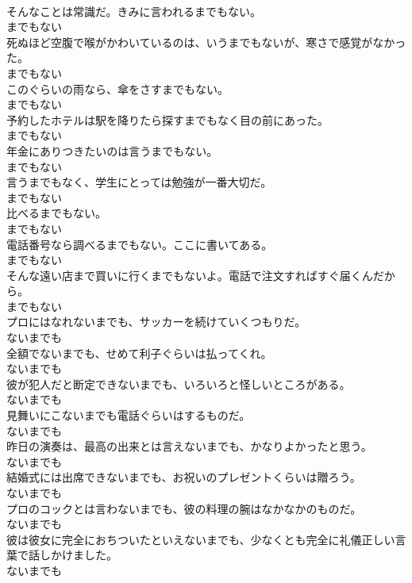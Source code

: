\documentclass[8pt]{extreport}
\begin{document}
\begin{CJK}{UTF8}{min}
\\	そんなことは常識だ。きみに言われるまでもない。	
\\	までもない
\\	死ぬほど空腹で喉がかわいているのは、いうまでもないが、寒さで感覚がなかった。	
\\	までもない
\\	このぐらいの雨なら、傘をさすまでもない。	
\\	までもない
\\	予約したホテルは駅を降りたら探すまでもなく目の前にあった。	
\\	までもない
\\	年金にありつきたいのは言うまでもない。	
\\	までもない
\\	言うまでもなく、学生にとっては勉強が一番大切だ。	
\\	までもない
\\	比べるまでもない。	
\\	までもない
\\	電話番号なら調べるまでもない。ここに書いてある。	
\\	までもない
\\	そんな遠い店まで買いに行くまでもないよ。電話で注文すればすぐ届くんだから。	
\\	までもない
\\	プロにはなれないまでも、サッカーを続けていくつもりだ。	
\\	ないまでも
\\	全額でないまでも、せめて利子ぐらいは払ってくれ。	
\\	ないまでも
\\	彼が犯人だと断定できないまでも、いろいろと怪しいところがある。	
\\	ないまでも
\\	見舞いにこないまでも電話ぐらいはするものだ。	
\\	ないまでも
\\	昨日の演奏は、最高の出来とは言えないまでも、かなりよかったと思う。	
\\	ないまでも
\\	結婚式には出席できないまでも、お祝いのプレゼントくらいは贈ろう。	
\\	ないまでも
\\	プロのコックとは言わないまでも、彼の料理の腕はなかなかのものだ。	
\\	ないまでも
\\	彼は彼女に完全におちついたといえないまでも、少なくとも完全に礼儀正しい言葉で話しかけました。	
\\	ないまでも

\end{CJK}
\end{document}
